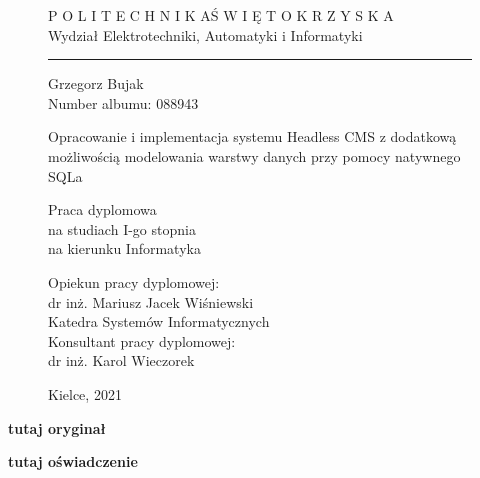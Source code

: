 \begin{figure}
    \arialsection
    \bfseries

    \centering
    \Large P O L I T E C H N I K A\quad Ś W I Ę T O K R Z Y S K A \\
    Wydział Elektrotechniki, Automatyki i Informatyki\\
    \rule{\linewidth}{1pt}

    \vspace{5cm}

    Grzegorz Bujak\\
    Number albumu: 088943\\
    \vspace{2cm}

    \LARGE Opracowanie i implementacja systemu Headless CMS 
    z dodatkową możliwością modelowania
    warstwy danych przy pomocy natywnego SQLa\\
    \vspace{1cm}

    \large Praca dyplomowa\\
    na studiach I-go stopnia\\
    na kierunku Informatyka\\
    \vspace{5cm}

    \normalfont
    \arialsection
    \raggedleft Opiekun pracy dyplomowej:\\
    dr inż. Mariusz Jacek Wiśniewski\\
    Katedra Systemów Informatycznych\\
    \vspace{.5cm}
    Konsultant pracy dyplomowej:\\
    dr inż. Karol Wieczorek\\
    \vspace{1cm}

    \centering
    Kielce, 2021
\end{figure}

\vspace{1cm}

\afterpage{\null\newpage}
\clearpage

{\centering\bfseries\Huge tutaj oryginał}

\afterpage{\null\newpage}
\clearpage

{\centering\bfseries\Huge tutaj oświadczenie}

\afterpage{\null\newpage}
\clearpage
